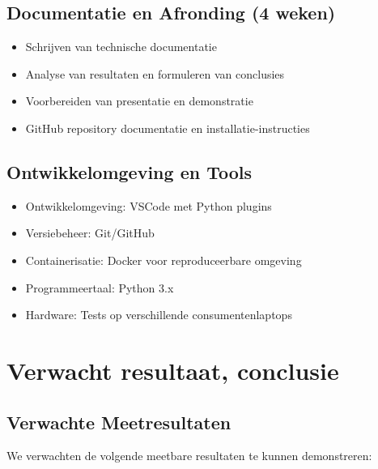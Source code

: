 \subsection{Documentatie en Afronding (4 weken)}
\begin{itemize}
    \item Schrijven van technische documentatie
    \item Analyse van resultaten en formuleren van conclusies
    \item Voorbereiden van presentatie en demonstratie
    \item GitHub repository documentatie en installatie-instructies
\end{itemize}

\subsection{Ontwikkelomgeving en Tools}
\begin{itemize}
    \item Ontwikkelomgeving: VSCode met Python plugins
    \item Versiebeheer: Git/GitHub
    \item Containerisatie: Docker voor reproduceerbare omgeving
    \item Programmeertaal: Python 3.x
    \item Hardware: Tests op verschillende consumentenlaptops
\end{itemize}

\section{Verwacht resultaat, conclusie}%
\label{sec:verwachte_resultaten}

\subsection{Verwachte Meetresultaten}

We verwachten de volgende meetbare resultaten te kunnen demonstreren:

